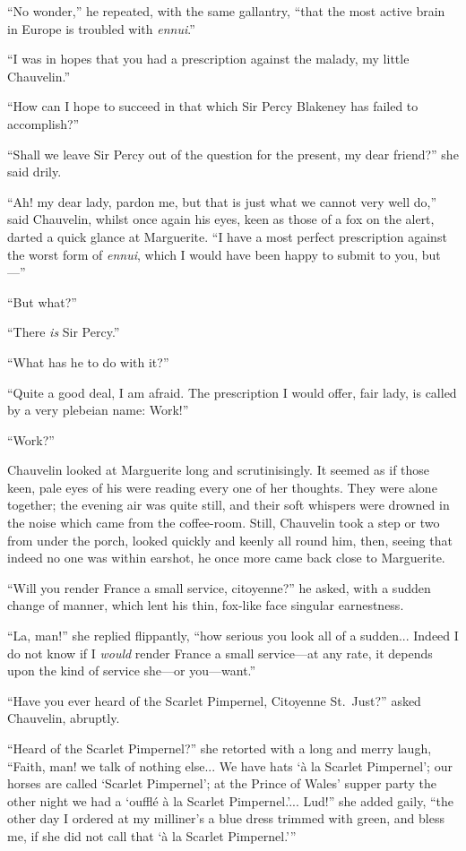 \documentclass[paper=5.5in:8.5in,BCOR=7mm,twoside,DIV=calc,12pt,usegeometry,chapterprefix,endperiod,headings=big]{scrbook}
\begin{document}
\enquote{No wonder,} he repeated, with the same gallantry, \enquote{that the most active brain in Europe is troubled with \textit{ennui}.}

\enquote{I was in hopes that you had a prescription against the malady, my little Chauvelin.}

\enquote{How can I hope to succeed in that which Sir Percy Blakeney has failed to accomplish?}

\enquote{Shall we leave Sir Percy out of the question for the present, my dear friend?} she said drily.

\enquote{Ah! my dear lady, pardon me, but that is just what we cannot very well do,} said Chauvelin, whilst once again his eyes, keen as those of a fox on the alert, darted a quick glance at Marguerite. \enquote{I have a most perfect prescription against the worst form of \textit{ennui}, which I would have been happy to submit to you, but---}

\enquote{But what?}

\enquote{There \textit{is} Sir Percy.}

\enquote{What has he to do with it?}

\enquote{Quite a good deal, I am afraid. The prescription I would offer, fair lady, is called by a very plebeian name: Work!}

\enquote{Work?}

Chauvelin looked at Marguerite long and scrutinisingly. It seemed as if those keen, pale eyes of his were reading every one of her thoughts. They were alone together; the evening air was quite still, and their soft whispers were drowned in the noise which came from the coffee-room. Still, Chauvelin took a step or two from under the porch, looked quickly and keenly all round him, then, seeing that indeed no one was within earshot, he once more came back close to Marguerite.

\enquote{Will you render France a small service, citoyenne?} he asked, with a sudden change of manner, which lent his thin, fox-like face singular earnestness.

\enquote{La, man!} she replied flippantly, \enquote{how serious you look all of a sudden... Indeed I do not know if I \textit{would} render France a small service---at any rate, it depends upon the kind of service she---or you---want.}

\enquote{Have you ever heard of the Scarlet Pimpernel, Citoyenne St.~Just?} asked Chauvelin, abruptly.

\enquote{Heard of the Scarlet Pimpernel?} she retorted with a long and merry laugh, \enquote{Faith, man! we talk of nothing else... We have hats \enquote{à la Scarlet Pimpernel}; our horses are called \enquote{Scarlet Pimpernel}; at the Prince of Wales’ supper party the other night we had a \enquote{oufflé à la Scarlet Pimpernel.}... Lud!} she added gaily, \enquote{the other day I ordered at my milliner's a blue dress trimmed with green, and bless me, if she did not call that \enquote{à la Scarlet Pimpernel.}}
\end{document}
